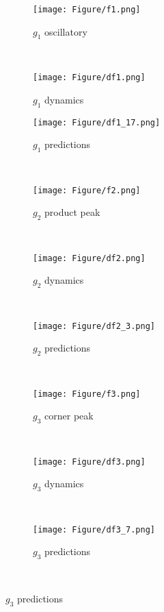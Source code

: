 \begin{figure}[htbp]
    \centering
    \begin{subfigure}[b]{0.3\textwidth}
        \texttt{[image: Figure/f1.png]}
        \caption{$g_1$ oscillatory}
        \label{app:fig:f1}
    \end{subfigure}
    ~ %
    \begin{subfigure}[b]{0.3\textwidth}
        \texttt{[image: Figure/df1.png]}
        \caption{$g_1$ dynamics}
        \label{app:fig:df1}
    \end{subfigure}
    \begin{subfigure}[b]{0.3\textwidth}
        \texttt{[image: Figure/df1\_17.png]}
        \caption{$g_1$ predictions}
        \label{app:fig:f2}
    \end{subfigure}\\ %

        \begin{subfigure}[b]{0.3\textwidth}
        \texttt{[image: Figure/f2.png]}
        \caption{$g_2$ product peak}
        \label{app:fig:f2}
    \end{subfigure}
    ~ %
    \begin{subfigure}[b]{0.3\textwidth}
        \texttt{[image: Figure/df2.png]}
        \caption{$g_2$ dynamics}
        \label{app:fig:df2}
    \end{subfigure}
    ~ %
    \begin{subfigure}[b]{0.3\textwidth}
        \texttt{[image: Figure/df2\_3.png]}
        \caption{$g_2$ predictions}
        \label{app:fig:df2}
    \end{subfigure}\\ %
            \begin{subfigure}[b]{0.3\textwidth}
        \texttt{[image: Figure/f3.png]}
        \caption{$g_3$ corner peak}
        \label{app:fig:f3}
    \end{subfigure}
    ~ %
    \begin{subfigure}[b]{0.3\textwidth}
        \texttt{[image: Figure/df3.png]}
        \caption{$g_3$ dynamics}
        \label{app:fig:df3}
    \end{subfigure}
    ~ %
    \begin{subfigure}[b]{0.3\textwidth}
        \texttt{[image: Figure/df3\_7.png]}
        \caption{$g_3$ predictions}
        \label{app:fig:df3}
    \end{subfigure}\\ %



\end{figure}
